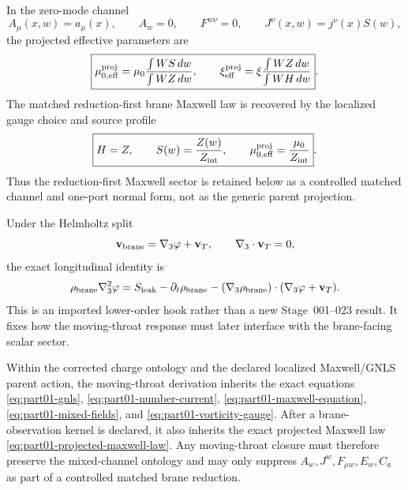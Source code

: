 In the zero-mode channel
\begin{equation}
A_\mu(x,w)=a_\mu(x),
\qquad
A_w=0,
\qquad
F^{w\nu}=0,
\qquad
J^\nu(x,w)=j^\nu(x)S(w),
\end{equation}
the projected effective parameters are
\begin{equation}
\label{eq:part01-projected-effective-parameters}
\boxed{
\mu_{0,\rm eff}^{\rm proj}
=\mu_0\frac{\int WS\,dw}{\int WZ\,dw},
\qquad
\xi_{\rm eff}^{\rm proj}
=\xi\frac{\int WZ\,dw}{\int WH\,dw}}.
\end{equation}
The matched reduction-first brane Maxwell law is recovered by the localized
gauge choice and source profile
\begin{equation}
\label{eq:part01-projection-reduction-match}
\boxed{
H=Z,
\qquad
S(w)=\frac{Z(w)}{Z_{\rm int}},
\qquad
\mu_{0,\rm eff}^{\rm proj}=\frac{\mu_0}{Z_{\rm int}}}.
\end{equation}
Thus the reduction-first Maxwell sector is retained below as a controlled
matched channel and one-port normal form, not as the generic parent projection.

Under the Helmholtz split
\begin{equation}
\mathbf v_{\rm brane}=\nabla_3\varphi+\mathbf v_T,
\qquad
\nabla_3\cdot\mathbf v_T=0,
\end{equation}
the exact longitudinal identity is
\begin{equation}
\label{eq:part01-longitudinal-identity}
\rho_{\rm brane}\nabla_3^2\varphi
=
S_{\rm leak}-\partial_t\rho_{\rm brane}
-(\nabla_3\rho_{\rm brane})\cdot(\nabla_3\varphi+\mathbf v_T).
\end{equation}
This is an imported lower-order hook rather than a new Stage~001--023 result.  It fixes how the moving-throat response must later interface with the brane-facing scalar sector.

\begin{theorem}
\label{thm:part01-parent-import}
Within the corrected charge ontology and the declared localized Maxwell/GNLS parent action, the moving-throat derivation inherits the exact equations \eqref{eq:part01-gnls}, \eqref{eq:part01-number-current}, \eqref{eq:part01-maxwell-equation}, \eqref{eq:part01-mixed-fields}, and \eqref{eq:part01-vorticity-gauge}.  After a brane-observation kernel is declared, it also inherits the exact projected Maxwell law \eqref{eq:part01-projected-maxwell-law}.  Any moving-throat closure must therefore preserve the mixed-channel ontology and may only suppress \(A_w,J^w,F_{\mu w},E_w,C_a\) as part of a controlled matched brane reduction.
\end{theorem}

